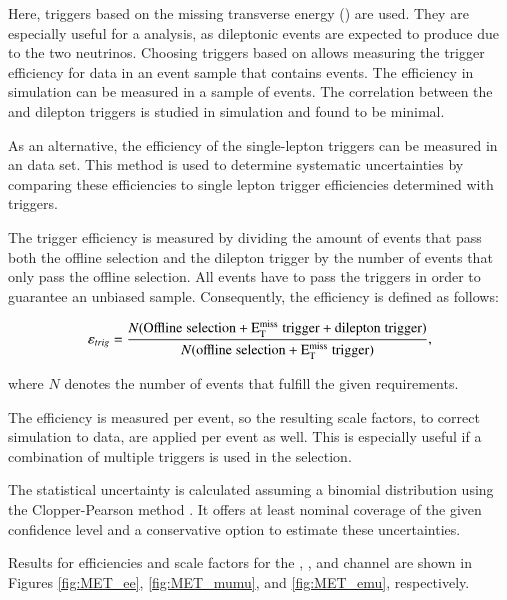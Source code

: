 Here, triggers based on the missing transverse energy (\ETm) are used. They are especially useful for a \ttbar analysis, 
as dileptonic \ttbar events are expected to produce \ETm due to the two neutrinos. Choosing triggers based on \ETm allows measuring the trigger efficiency for data
in an event sample that contains \ttbar events. The efficiency in simulation can be measured in a sample of \ttbar events.
The correlation between the \ETm and dilepton triggers is studied in simulation and found to be minimal.

As an alternative, the efficiency of the single-lepton triggers can be measured in an \emu data set.
This method is used to determine systematic uncertainties by comparing these efficiencies to single lepton trigger efficiencies determined with \ETm triggers.

The trigger efficiency is measured by dividing the amount of events that pass both the offline selection and the dilepton trigger by the number of events that only pass the offline selection.
All events have to pass the \ETm triggers in order to guarantee an unbiased sample. Consequently, the efficiency is defined as follows: 

\begin{equation}
\varepsilon_{trig} = \frac{N(\mathrm{Offline\; selection + E_{\mathrm{T}}^{\text{miss}} \; trigger + dilepton\; trigger})}{N(\mathrm{offline\; selection + E_{\mathrm{T}}^{\text{miss}} \; trigger})},
\label{eq:TriggerEff}
\end{equation}

where $N$ denotes the number of events that fulfill the given requirements.

The efficiency is measured per event, so the resulting scale factors, to correct simulation to data, are applied per event as well.
This is especially useful if a combination of multiple triggers is used in the selection.

The statistical uncertainty is calculated assuming a binomial distribution using the Clopper-Pearson method \cite{10.2307/2331986,2010NIMPA.612..388C}. It offers at least nominal coverage 
of the given confidence level and a conservative option to estimate these uncertainties. 

Results for efficiencies and scale factors for the \ee, \mumu, and \emu channel are shown in Figures \ref{fig:MET_ee}, \ref{fig:MET_mumu}, and \ref{fig:MET_emu}, respectively.

